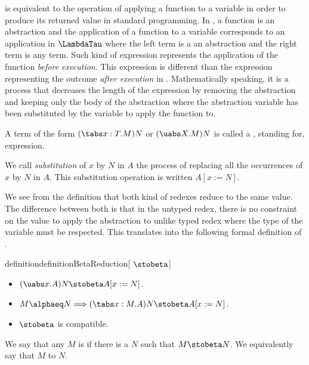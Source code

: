 \betareduction is equivalent to the operation of applying a function to a variable in order to produce its returned value in standard programming. In \lambdacalc, a function is an abstraction and the application of a function to a variable corresponds to an application in $\LambdaTau$ where the left term is a an abstraction and the right term is any term. Such kind of expression represents the application of the function \textit{before execution}. This expression is different than the expression representing the outcome \textit{after execution} in \lambdacalc.
Mathematically speaking, it is a process that decreases the length of the expression by removing the abstraction and keeping only the body of the abstraction where the abstraction variable has been substituted by the variable to apply the function to.

\begin{definition}
    A term of the form $(\tabs x:T.M)N$ or $(\uabs X.M)N$ is called a \textit{\betaredex}, standing for, \betareducible expression.
\end{definition}

\begin{definition}
    We call \textit{substitution} of $x$ by $N$ in $A$ the process of replacing all the occurrences of $x$ by $N$ in $A$. This substitution operation is written $A[x := N]$.
\end{definition}

We see from the definition that both kind of redexes reduce to the same value. The difference between both is that in the untyped redex, there is no constraint on the value to apply the abstraction to unlike typed redex where the type of the variable must be respected. This translates into the following formal definition of \ostepbetareduction.

\begin{reusable}{definition}{definitionBetaReduction}[ \ostepbetareduction $\stobeta$]
\begin{itemize}
    \item $(\uabs x.A)N \stobeta A[x := N]$.
    \item $M \alphaeq N \Longrightarrow (\tabs x:M.A)N \stobeta A[x := N]$.
    \item $\stobeta$ is compatible.
\end{itemize}
\end{reusable}

\begin{definition}
    We say that any $M$ is \ostepbetareducible if there is a $N$ such that $M \stobeta N$. We equivalently say that $M$ \betareduces to $N$.
\end{definition}


